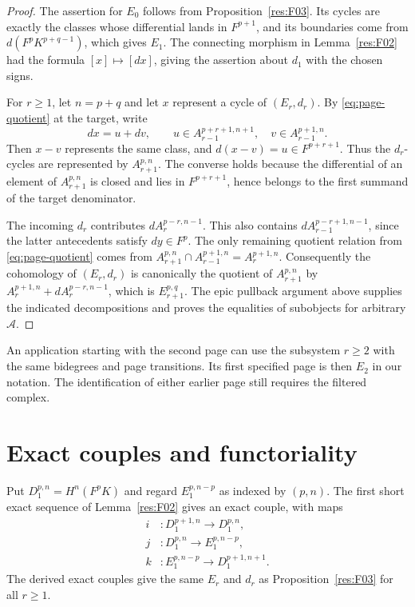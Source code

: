 \begin{proof}
The assertion for $E_0$ follows from Proposition~\ref{res:F03}. Its
cycles are exactly the classes whose differential lands in $F^{p+1}$,
and its boundaries come from $d(F^pK^{p+q-1})$, which gives $E_1$.
The connecting morphism in Lemma~\ref{res:F02} had the formula
$[x]\mapsto[dx]$, giving the assertion about $d_1$ with the chosen signs.

For $r\geq1$, let $n=p+q$ and let $x$ represent a cycle of $(E_r,d_r)$.
By \eqref{eq:page-quotient} at the target, write
\[
 dx=u+dv,\qquad
 u\in A_{r-1}^{p+r+1,n+1},\quad v\in A_{r-1}^{p+1,n}.
\]
Then $x-v$ represents the same class, and $d(x-v)=u\in F^{p+r+1}$.
Thus the $d_r$-cycles are represented by $A_{r+1}^{p,n}$. The converse
holds because the differential of an element of $A_{r+1}^{p,n}$ is
closed and lies in $F^{p+r+1}$, hence belongs to the first summand of
the target denominator.

The incoming $d_r$ contributes $d A_r^{p-r,n-1}$. This also contains
$d A_{r-1}^{p-r+1,n-1}$, since the latter antecedents satisfy
$d y\in F^p$. The only remaining quotient relation from
\eqref{eq:page-quotient} comes from
$A_{r+1}^{p,n}\cap A_{r-1}^{p+1,n}=A_r^{p+1,n}$. Consequently the
cohomology of $(E_r,d_r)$ is canonically the quotient of
$A_{r+1}^{p,n}$ by
$A_r^{p+1,n}+d A_r^{p-r,n-1}$, which is $E_{r+1}^{p,q}$.
The epic pullback argument above supplies the indicated decompositions
and proves the equalities of subobjects for arbitrary $\mathcal A$.
\end{proof}

An application starting with the second page can use the subsystem
$r\geq2$ with the same bidegrees and page transitions. Its first
specified page is then $E_2$ in our notation. The identification
of either earlier page still requires the filtered complex.

\section{Exact couples and functoriality}

\begin{theorem}
\label{res:F05}
Put $D_1^{p,n}=H^n(F^pK)$ and regard $E_1^{p,n-p}$ as indexed by
$(p,n)$. The first short exact sequence of Lemma~\ref{res:F02}
gives an exact couple, with maps
\[
\begin{split}
 i&\colon D_1^{p+1,n}\longrightarrow D_1^{p,n},\\
 j&\colon D_1^{p,n}\longrightarrow E_1^{p,n-p},\\
 k&\colon E_1^{p,n-p}\longrightarrow D_1^{p+1,n+1}.
\end{split}
\]
The derived exact couples give the same $E_r$ and $d_r$ as
Proposition~\ref{res:F03} for all $r\geq1$.
\end{theorem}

